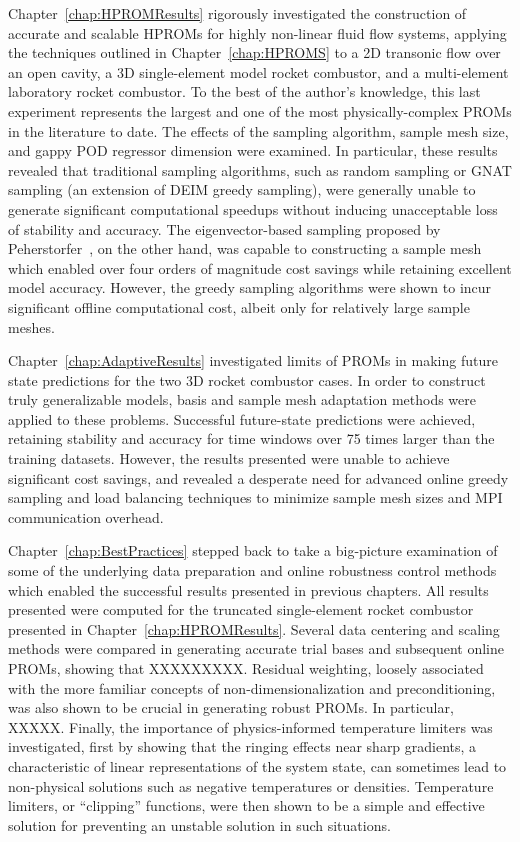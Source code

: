 Chapter~\ref{chap:HPROMResults} rigorously investigated the construction of accurate and scalable HPROMs for highly non-linear fluid flow systems, applying the techniques outlined in Chapter~\ref{chap:HPROMS} to a 2D transonic flow over an open cavity, a 3D single-element model rocket combustor, and a multi-element laboratory rocket combustor. To the best of the author's knowledge, this last experiment represents the largest and one of the most physically-complex PROMs in the literature to date. The effects of the sampling algorithm, sample mesh size, and gappy POD regressor dimension were examined. In particular, these results revealed that traditional sampling algorithms, such as random sampling or GNAT sampling (an extension of DEIM greedy sampling), were generally unable to generate significant computational speedups without inducing unacceptable loss of stability and accuracy. The eigenvector-based sampling proposed by Peherstorfer~\cite{Peherstorfer2020}, on the other hand, was capable to constructing a sample mesh which enabled over four orders of magnitude cost savings while retaining excellent model accuracy. However, the greedy sampling algorithms were shown to incur significant offline computational cost, albeit only for relatively large sample meshes.

Chapter~\ref{chap:AdaptiveResults} investigated limits of PROMs in making future state predictions for the two 3D rocket combustor cases. In order to construct truly generalizable models, basis and sample mesh adaptation methods were applied to these problems. Successful future-state predictions were achieved, retaining stability and accuracy for time windows over 75 times larger than the training datasets. However, the results presented were unable to achieve significant cost savings, and revealed a desperate need for advanced online greedy sampling and load balancing techniques to minimize sample mesh sizes and MPI communication overhead.

Chapter~\ref{chap:BestPractices} stepped back to take a big-picture examination of some of the underlying data preparation and online robustness control methods which enabled the successful results presented in previous chapters. All results presented were computed for the truncated single-element rocket combustor presented in Chapter~\ref{chap:HPROMResults}. Several data centering and scaling methods were compared in generating accurate trial bases and subsequent online PROMs, showing that {\color{red}XXXXXXXXX}. Residual weighting, loosely associated with the more familiar concepts of non-dimensionalization and preconditioning, was also shown to be crucial in generating robust PROMs. In particular, {\color{red}XXXXX}. Finally, the importance of physics-informed temperature limiters was investigated, first by showing that the ringing effects near sharp gradients, a characteristic of linear representations of the system state, can sometimes lead to non-physical solutions such as negative temperatures or densities. Temperature limiters, or ``clipping'' functions, were then shown to be a simple and effective solution for preventing an unstable solution in such situations.

